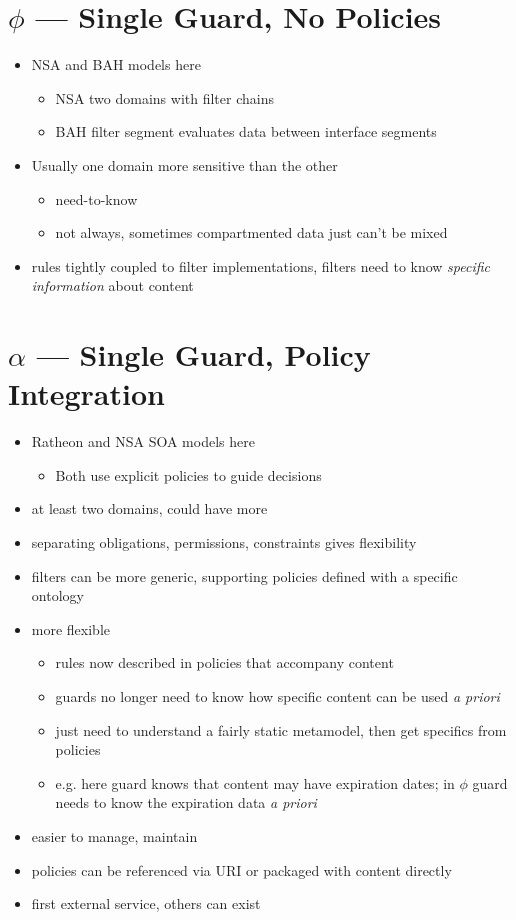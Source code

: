 \documentclass[10pt,letterpaper]{article}
\author{Chris Lamb}
\begin{document}
\section*{$\phi$ --- Single Guard, No Policies}
\begin{itemize}
\item NSA and BAH models here
\begin{itemize}
\item NSA two domains with filter chains
\item BAH filter segment evaluates data between interface segments
\end{itemize}
\item Usually one domain more sensitive than the other
\begin{itemize}
\item need-to-know
\item not always, sometimes compartmented data just can't be mixed
\end{itemize}
\item rules tightly coupled to filter implementations, filters need to know \textit{specific information} about content
\end{itemize}

\section*{$\alpha$ --- Single Guard, Policy Integration}
\begin{itemize}
\item Ratheon and NSA SOA models here
\begin{itemize}
\item Both use explicit policies to guide decisions
\end{itemize}
\item at least two domains, could have more
\item separating obligations, permissions, constraints gives flexibility
\item filters can be more generic, supporting policies defined with a specific ontology
\item more flexible
\begin{itemize}
\item rules now described in policies that accompany content
\item guards no longer need to know how specific content can be used \textit{a priori}
\item just need to understand a fairly static metamodel, then get specifics from policies
\item e.g. here guard knows that content may have expiration dates; in $\phi$ guard needs to know the expiration data \textit{a priori}
\end{itemize}
\item easier to manage, maintain
\item policies can be referenced via URI or packaged with content directly
\item first external service, others can exist
\end{itemize}
\end{document}
